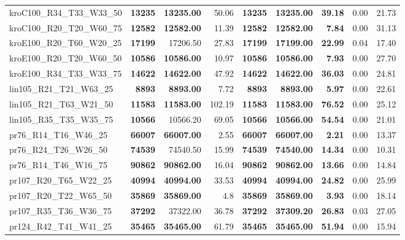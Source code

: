 \documentclass{singlecol-new}
\begin{document}
{\begin{longtable}{lrrrrrrrr}
		kroC100\_R34\_T33\_W33\_50 & \textbf{13235} & \textbf{13235.00} & 50.06 & \textbf{13235} & \textbf{13235.00} & \textbf{39.18} & 0.00 & 21.73 \\
		kroC100\_R20\_T20\_W60\_75 & \textbf{12582} & \textbf{12582.00} & 11.39 & \textbf{12582} & \textbf{12582.00} & \textbf{7.84} & 0.00 & 31.13 \\
		kroE100\_R20\_T60\_W20\_25 & \textbf{17199} & 17206.50 & 27.83 & \textbf{17199} & \textbf{17199.00} & \textbf{22.99} & 0.04 & 17.40 \\
		kroE100\_R20\_T20\_W60\_50 & \textbf{10586} & \textbf{10586.00} & 10.97 & \textbf{10586} & \textbf{10586.00} & \textbf{7.93} & 0.00 & 27.70 \\
		kroE100\_R34\_T33\_W33\_75 & \textbf{14622} & \textbf{14622.00} & 47.92 & \textbf{14622} & \textbf{14622.00} & \textbf{36.03} & 0.00 & 24.81 \\
		lin105\_R21\_T21\_W63\_25 & \textbf{8893} & \textbf{8893.00} & 7.72 & \textbf{8893} & \textbf{8893.00} & \textbf{5.97} & 0.00 & 22.61 \\
		lin105\_R21\_T63\_W21\_50 & \textbf{11583} & \textbf{11583.00} & 102.19 & \textbf{11583} & \textbf{11583.00} & \textbf{76.52} & 0.00 & 25.12 \\
		lin105\_R35\_T35\_W35\_75 & \textbf{10566} & 10566.20 & 69.05 & \textbf{10566} & \textbf{10566.00} & \textbf{54.54} & 0.00 & 21.01 \\
		pr76\_R14\_T16\_W46\_25 & \textbf{66007} & \textbf{66007.00} & 2.55 & \textbf{66007} & \textbf{66007.00} & \textbf{2.21} & 0.00 & 13.37 \\
		pr76\_R24\_T26\_W26\_50 & \textbf{74539} & 74540.50 & 15.99 & \textbf{74539} & \textbf{74540.00} & \textbf{14.34} & 0.00 & 10.31 \\
		pr76\_R14\_T46\_W16\_75 & \textbf{90862} & \textbf{90862.00} & 16.04 & \textbf{90862} & \textbf{90862.00} & \textbf{13.66} & 0.00 & 14.84 \\
		pr107\_R20\_T65\_W22\_25 & \textbf{40994} & \textbf{40994.00} & 33.53 & \textbf{40994} & \textbf{40994.00} & \textbf{24.82} & 0.00 & 25.99 \\
		pr107\_R20\_T22\_W65\_50 & \textbf{35869} & \textbf{35869.00} & 4.8 & \textbf{35869} & \textbf{35869.00} & \textbf{3.93} & 0.00 & 18.14 \\
		pr107\_R35\_T36\_W36\_75 & \textbf{37292} & 37322.00 & 36.78 & \textbf{37292} & \textbf{37309.20} & \textbf{26.83} & 0.03 & 27.05 \\
		pr124\_R42\_T41\_W41\_25 & \textbf{35465} & \textbf{35465.00} & 61.79 & \textbf{35465} & \textbf{35465.00} & \textbf{51.94} & 0.00 & 15.94 \\

\end{longtable}}
\end{document}
